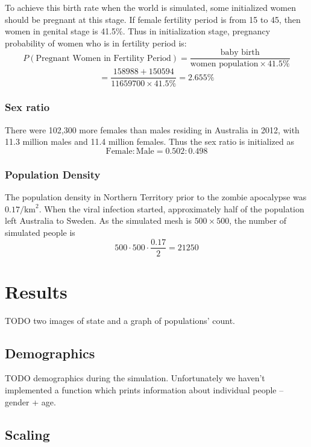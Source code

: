 \documentclass[a4paper]{article}
\begin{document}
To achieve this birth rate when the world is simulated, some initialized women should be pregnant at this stage.
If female fertility period is from 15 to 45, then women in genital stage is 41.5\%.
Thus in initialization stage, pregnancy probability of women who is in fertility period is: 
$$ P(\text{Pregnant Women in Fertility Period}) = \frac{\text{baby birth}}{\text{women population} \times 41.5\%} $$
$$ = \frac{158988+150594}{11659700 \times 41.5\%} = 2.655\% $$

\subsubsection{Sex ratio}

There were 102,300 more females than males residing in Australia in 2012, with 11.3 million males and 11.4 million females.\cite{abspopulation}
Thus the sex ratio is initialized as 
$$ \text{Female} : \text{Male} = 0.502 : 0.498 $$

\subsubsection{Population Density}

The population density in Northern Territory prior to the zombie apocalypse was $0.17/\text{km}^2$. \cite{northernterritory}
When the viral infection started, approximately half of the population left Australia to Sweden. \cite{project}
As the simulated mesh is $500 \times 500$, the number of simulated people is
$$ 500 \cdot 500 \cdot \frac{0.17}{2} = 21250 $$

\section{Results}

TODO two images of state and a graph of populations' count.

\subsection{Demographics}

TODO demographics during the simulation.
Unfortunately we haven't implemented a function which prints information about individual people -- gender + age.

\subsection{Scaling}
\end{document}
